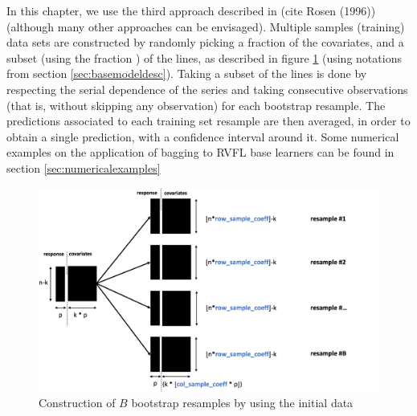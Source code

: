 \medskip

In this chapter, we use the third approach described in (cite Rosen (1996))  (although many other approaches can be envisaged). Multiple samples (training) data sets are constructed by randomly picking a fraction  of the covariates, and a subset (using the fraction ) of the lines, as described in figure \ref{bootstrap_resampling_plot} (using notations from section \ref{sec:basemodeldesc}). Taking a subset of the lines is done by respecting the serial dependence of the series and taking consecutive observations (that is, without skipping any observation) for each bootstrap resample. The predictions associated to each training set resample are then averaged, in order to obtain a single prediction, with a confidence interval around it. Some numerical examples on the application of bagging to RVFL base learners can be found in section \ref{sec:numericalexamples}

\begin{figure}[!htb]
\centering
\includegraphics[width=12cm]{gfx/chapter-rvfl-ensembles/bootstrap_resampling.png}
\caption{Construction of $B$ bootstrap resamples by using the initial data}
\label{bootstrap_resampling_plot}
\end{figure}

